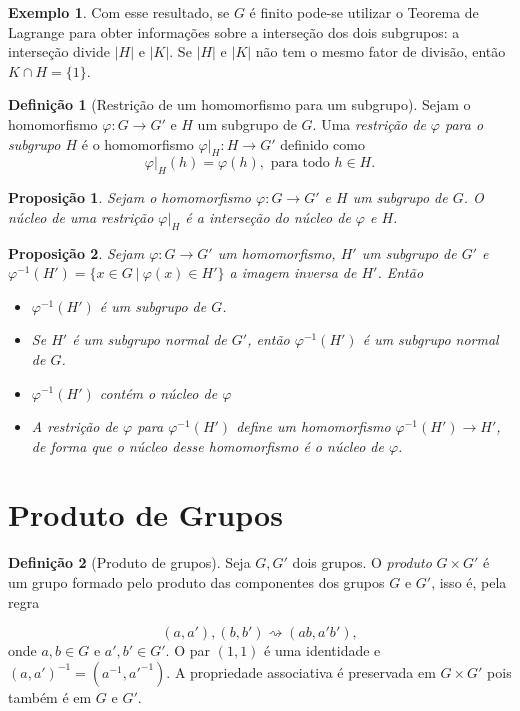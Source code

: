 \documentclass[a4paper,12pt]{report}
\theoremstyle{plain}
\newtheorem{proposicao}{Proposição}[section]
\theoremstyle{definition}
\newtheorem{definicao}{Definição}[section]
\newtheorem{exemplo}{Exemplo}[section]
\begin{document}
\begin{exemplo}
	Com esse resultado, se \(G\) é finito pode-se utilizar o
	Teorema de Lagrange para obter informações sobre a interseção dos dois
	subgrupos: a interseção divide \(|H|\) e \(|K|\). Se \(|H|\) e \(|K|\)
	não tem o mesmo fator de divisão, então \(K\cap H = \{1\}\).	
\end{exemplo}

\begin{definicao}[Restrição de um homomorfismo para um subgrupo]
	Sejam o homomorfismo \(\varphi:G\longrightarrow G'\)
	e \(H\) um subgrupo de \(G\). Uma \emph{restrição de \(\varphi\) para o subgrupo \(H\)} é o homomorfismo \(\varphi|_H:H\longrightarrow G'\)
	definido como
	\[\varphi|_H(h) = \varphi(h), \text{ para todo }h\in H.\]	
\end{definicao}

\begin{proposicao}
	Sejam o homomorfismo
	\(\varphi:G\longrightarrow G'\) e \(H\) um subgrupo de \(G\). O núcleo
	de uma restrição \(\varphi|_H\) é a interseção do núcleo de \(\varphi\)
	e \(H\).	
\end{proposicao}

\begin{proposicao}
	 Sejam \(\varphi:G\longrightarrow G'\) um
	homomorfismo, \(H'\) um subgrupo de \(G'\) e
	\(\varphi^{-1}(H') = \{x \in G \ | \ \varphi(x) \in H'\}\) a imagem
	inversa de \(H'\). Então
	\begin{itemize}
		\item \(\varphi^{-1}(H')\) é um subgrupo de \(G\).
		\item Se \(H'\) é um subgrupo normal de \(G'\), então \(\varphi^{-1}(H')\) é
		um subgrupo normal de \(G\).
		\item \(\varphi^{-1}(H')\) contém o núcleo de \(\varphi\)
		\item A restrição de \(\varphi\) para \(\varphi^{-1}(H')\) define um
		homomorfismo \(\varphi^{-1}(H')\longrightarrow H'\), de forma que o
		núcleo desse homomorfismo é o núcleo de \(\varphi\).
	\end{itemize}
\end{proposicao}

\section{Produto de Grupos}

\begin{definicao}[Produto de grupos]
	Seja \(G,G'\) dois grupos. O \emph{produto}
	\(G\times G'\) é um grupo formado pelo produto das componentes dos
	grupos \(G\) e \(G'\), isso é, pela regra
	
	\[ (a,a'), (b,b') \rightsquigarrow (ab,a'b'), \] onde \(a,b \in G\) e
	\(a',b'\in G'\). O par \((1,1)\) é uma identidade e
	\((a,a')^{-1} = (a^{-1},a'^{-1})\). A propriedade associativa é
	preservada em \(G\times G'\) pois também é em \(G\) e \(G'\).
\end{definicao}
\end{document}
